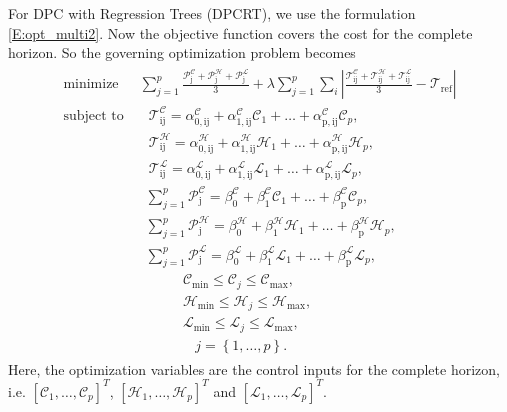 %
For DPC with Regression Trees (DPCRT), we use the formulation \eqref{E:opt_multi2}. Now the objective function covers the cost for the complete horizon. So the governing optimization problem becomes
\begin{align}
\begin{aligned}
\text{minimize } & \sum_{j=1}^p \frac{\mathcal{P}_{\mathrm{j}}^{\mathcal{C}} + \mathcal{P}_{\mathrm{j}}^{\mathcal{H}} + \mathcal{P}_{\mathrm{j}}^{\mathcal{L}}}{3} +  \lambda \sum_{j=1}^p \sum_i \left| \frac{\mathcal{T}_{\mathrm{ij}}^{\mathcal{C}}+\mathcal{T}_{\mathrm{ij}}^{\mathcal{H}}+\mathcal{T}_{\mathrm{ij}}^{\mathcal{L}}}{3} - \mathcal{T}_{\mathrm{ref}} \right| \\ 
\text{subject to } & \ \ \ \mathcal{T}_{\mathrm{ij}}^{\mathcal{C}}  = \alpha_{\mathrm{0,ij}}^{\mathcal{C}} + \alpha_{\mathrm{1,ij}}^{\mathcal{C}} \mathcal{C}_1 + \dots + \alpha_{\mathrm{p,ij}}^{\mathcal{C}} \mathcal{C}_p , \\
\ \ \ & \ \ \ \mathcal{T}_{\mathrm{ij}}^{\mathcal{H}}  = \alpha_{\mathrm{0,ij}}^{\mathcal{H}} + \alpha_{\mathrm{1,ij}}^{\mathcal{H}} \mathcal{H}_1 + \dots + \alpha_{\mathrm{p,ij}}^{\mathcal{H}} \mathcal{H}_p , \\
\ \ \ & \ \ \ \mathcal{T}_{\mathrm{ij}}^{\mathcal{L}}  = \alpha_{\mathrm{0,ij}}^{\mathcal{L}} + \alpha_{\mathrm{1,ij}}^{\mathcal{L}} \mathcal{L}_1 + \dots + \alpha_{\mathrm{p,ij}}^{\mathcal{L}} \mathcal{L}_p , \\
\ \ \ & \ \ \sum_{j=1}^p\mathcal{P}_{\mathrm{j}}^{\mathcal{C}}  = \beta_{\mathrm{0}}^{\mathcal{C}} + \beta_{\mathrm{1}}^{\mathcal{C}} \mathcal{C}_1 + \dots + \beta_{\mathrm{p}}^{\mathcal{C}} \mathcal{C}_p , \\
\ \ \ & \ \ \sum_{j=1}^p\mathcal{P}_{\mathrm{j}}^{\mathcal{H}}  = \beta_{\mathrm{0}}^{\mathcal{H}} + \beta_{\mathrm{1}}^{\mathcal{H}} \mathcal{H}_1 + \dots + \beta_{\mathrm{p}}^{\mathcal{H}} \mathcal{H}_p , \\
\ \ \ & \ \ \sum_{j=1}^p\mathcal{P}_{\mathrm{j}}^{\mathcal{L}}  = \beta_{\mathrm{0}}^{\mathcal{L}} + \beta_{\mathrm{1}}^{\mathcal{L}} \mathcal{L}_1 + \dots + \beta_{\mathrm{p}}^{\mathcal{L}} \mathcal{L}_p , \\
  \ \ \ \ \ & \ \ \ \ \ \ \ \ \ \ \ \ \ \ \mathcal{C}_{\mathrm{min}} \leq \mathcal{C}_j \leq \mathcal{C}_{\mathrm{max}}, \\ 
  \ \ \ \ \ & \ \ \ \ \ \ \ \ \ \ \ \ \ \ \mathcal{H}_{\mathrm{min}} \leq \mathcal{H}_j \leq \mathcal{H}_{\mathrm{max}}, \\ 
  \ \ \ \ \ & \ \ \ \ \ \ \ \ \ \ \ \ \ \ \mathcal{L}_{\mathrm{min}} \leq \mathcal{L}_j \leq \mathcal{L}_{\mathrm{max}}, \\
    \ \ \ \ \ \ \ & \ \ \ \ \ \ \ \ \ \ \ \ \ \ \ \ \ \ j = \left\lbrace 1, \dots, p \right\rbrace.
  \end{aligned}
  \label{E:DPCRT}
\end{align}
Here, the optimization variables are the control inputs for the complete horizon, i.e. $\left[  \mathcal{C}_1, \dots, \mathcal{C}_p  \right]^T $, $\left[  \mathcal{H}_1, \dots, \mathcal{H}_p  \right]^T $ and $\left[  \mathcal{L}_1, \dots, \mathcal{L}_p  \right]^T $.

